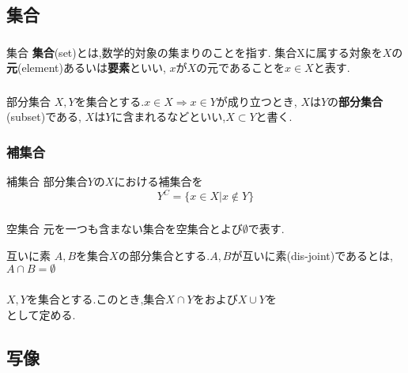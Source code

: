 \documentclass[dvipdfmx,b4j]{jsarticle}
\begin{document}
\tableofcontents
\section{}

\subsection{集合}

\subsubsection{}
\begin{definition}{集合}{}
\textbf{集合}(set)とは,数学的対象の集まりのことを指す.
集合Xに属する対象を$X$の\textbf{元}(element)あるいは\textbf{要素}といい,
$x$が$X$の元であることを$x\in X$と表す.
\end{definition}
\subsubsection{}
\begin{definition}{部分集合}{}
$X,Y$を集合とする.$x\in X\Longrightarrow x\in Y$が成り立つとき,
$X$は$Y$の\textbf{部分集合}(subset)である,
$X$は$Y$に含まれるなどといい,$X\subset Y$と書く.
\end{definition}
\subsubsection{補集合}
\begin{definition}{補集合}{}
部分集合$Y$の$X$における補集合を
$$Y^C=\{x\in X|x\not\in Y\}$$
\end{definition}
\subsubsection{}
\begin{definition}{空集合}{}
元を一つも含まない集合を空集合とよび$\emptyset$で表す.
\end{definition}
\begin{definition}{互いに素}{}
$A,B$を集合$X$の部分集合とする.$A,B$が互いに素(dis-joint)であるとは,$A\cap B=\emptyset $ 
\end{definition}
\subsubsection{}
\begin{definition}{}{}
$X,Y$を集合とする.このとき,集合$X\cap Y$をおよび$X\cup Y$を
$$$$%
として定める.
\end{definition}
\subsection{写像}
\end{document}
